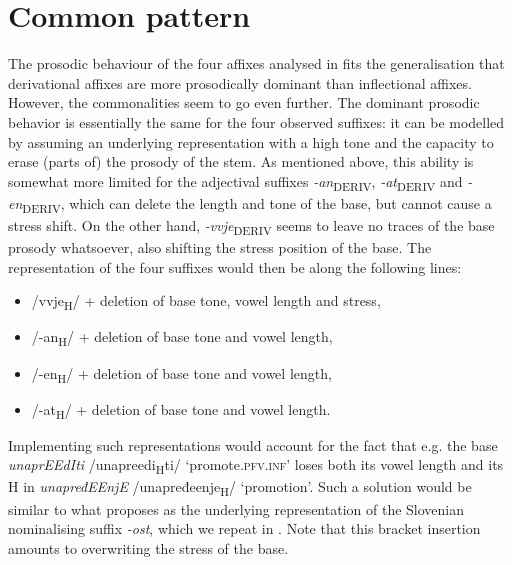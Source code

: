 \documentclass[output=paper]{langsci/langscibook}
\begin{document}
\section{Common pattern}\label{sec:simonovic:5}

The prosodic behaviour of the four affixes analysed in  fits the generalisation that derivational affixes are more prosodically dominant than inflectional affixes. However, the commonalities seem to go even further. The dominant prosodic behavior is essentially the same for the four observed suffixes: it can be modelled by assuming an underlying representation with a high tone and the capacity to erase (parts of) the prosody of the stem. As mentioned above, this ability is somewhat more limited for the adjectival suffixes \textit{-an}\textsubscript{DERIV}, \textit{-at}\textsubscript{DERIV} and \textit{-en}\textsubscript{DERIV}, which can delete the length and tone of the base, but cannot cause a stress shift. On the other hand, \textit{-vvje}\textsubscript{DERIV}  seems to leave no traces of the base prosody whatsoever, also shifting the stress position of the base. The representation of the four suffixes would then be along the following lines: \begin{itemize}
\item /vvje\textsubscript{H}/ + deletion of base tone, vowel length and stress,
\item /-an\textsubscript{H}/ + deletion of base tone and vowel length,
\item /-en\textsubscript{H}/ + deletion of base tone and vowel length, 
\item /-at\textsubscript{H}/ + deletion of base tone and vowel length.
\end{itemize}
Implementing such representations would account for the fact that e.g. the base \textit{unaprEEdIti }/unapreedi\textsubscript{H}ti/ `promote.\textsc{pfv.inf}' loses both its vowel length and its H in \textit{unapređEEnjE} /unapređeenje\textsubscript{H}/ `promotion'. Such a solution would be similar to what \citet{Mar2002} proposes as the underlying representation of the Slovenian nominalising suffix \textit{-ost}, which we repeat in . Note that this bracket insertion amounts to overwriting the stress of the base.
\end{document}
